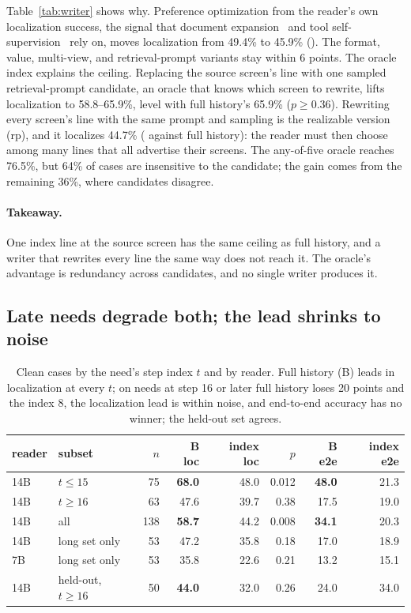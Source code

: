 Table~\ref{tab:writer} shows why. Preference optimization from the reader's own localization success, the signal that document expansion~\citep{doc2query} and tool self-supervision~\citep{toolformer} rely on, moves localization from 49.4\% to 45.9\% (). The format, value, multi-view, and retrieval-prompt variants stay within 6 points. The oracle index explains the ceiling. Replacing the source screen's line with one sampled retrieval-prompt candidate, an oracle that knows which screen to rewrite, lifts localization to 58.8--65.9\%, level with full history's 65.9\% ($p\ge0.36$). Rewriting every screen's line with the same prompt and sampling is the realizable version (rp), and it localizes 44.7\% ( against full history): the reader must then choose among many lines that all advertise their screens. The any-of-five oracle reaches 76.5\%, but 64\% of cases are insensitive to the candidate; the gain comes from the remaining 36\%, where candidates disagree.

\paragraph{Takeaway.} One index line at the source screen has the same ceiling as full history, and a writer that rewrites every line the same way does not reach it. The oracle's advantage is redundancy across candidates, and no single writer produces it.

\subsection{Late needs degrade both; the lead shrinks to noise}
\label{sec:length}
\begin{table}[t]
\centering\footnotesize
\caption{Clean cases by the need's step index $t$ and by reader. Full history (B) leads in localization at every $t$; on needs at step 16 or later full history loses 20 points and the index 8, the localization lead is within noise, and end-to-end accuracy has no winner; the held-out set agrees.}
\label{tab:length}
\begin{tabular}{llrrrrrr}
\toprule
reader & subset & $n$ & B loc & index loc & $p$ & B e2e & index e2e \\
\midrule
14B & $t\le15$ & 75 & \textbf{68.0} & 48.0 & 0.012 & \textbf{48.0} & 21.3 \\
14B & $t\ge16$ & 63 & 47.6 & 39.7 & 0.38 & 17.5 & 19.0 \\
14B & all & 138 & \textbf{58.7} & 44.2 & 0.008 & \textbf{34.1} & 20.3 \\
14B & long set only & 53 & 47.2 & 35.8 & 0.18 & 17.0 & 18.9 \\
7B & long set only & 53 & 35.8 & 22.6 & 0.21 & 13.2 & 15.1 \\
14B & held-out, $t\ge16$ & 50 & \textbf{44.0} & 32.0 & 0.26 & 24.0 & 34.0 \\
\bottomrule
\end{tabular}
\end{table}

